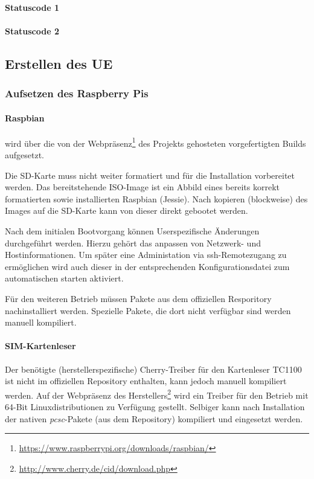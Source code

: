     \paragraph{Statuscode 1}
    \paragraph{Statuscode 2}

	\subsection{Erstellen des UE}
		\subsubsection{Aufsetzen des Raspberry Pis}
        \label{subsubsec:installpi}
			\paragraph{Raspbian} wird über die von der Webpräsenz\footnote{\url{https://www.raspberrypi.org/downloads/raspbian/}}
            des Projekts gehosteten vorgefertigten Builds aufgesetzt.

            Die SD-Karte muss nicht weiter formatiert und für die Installation vorbereitet werden. Das
            bereitstehende ISO-Image ist ein Abbild eines bereits korrekt formatierten sowie installierten
            Raspbian (Jessie). Nach kopieren (blockweise) des Images auf die SD-Karte kann von dieser direkt
            gebootet werden.

            Nach dem initialen Bootvorgang können Userspezifische Änderungen durchgeführt werden. Hierzu
            gehört das anpassen von Netzwerk- und Hostinformationen. Um später eine Administation via
            \ac{ssh}-Remotezugang zu ermöglichen wird auch dieser in der entsprechenden Konfigurationsdatei
            zum automatischen starten aktiviert.

            Für den weiteren Betrieb müssen Pakete aus dem offiziellen Resporitory
            nachinstalliert werden. Spezielle Pakete, die dort nicht verfügbar sind werden
            manuell kompiliert.

            \paragraph{SIM-Kartenleser} Der benötigte (herstellerspezifische)
            Cherry-Treiber für den Kartenleser TC1100 ist nicht im offiziellen Repository enthalten, kann jedoch
            manuell kompiliert werden. Auf der Webpräsenz des Herstellers\footnote{\url{http://www.cherry.de/cid/download.php}}
            wird ein Treiber für den Betrieb mit 64-Bit Linuxdistributionen zu Verfügung gestellt.
            Selbiger kann nach Installation der nativen \textit{pcsc}-Pakete (aus dem Repository)
            kompiliert und eingesetzt werden.

